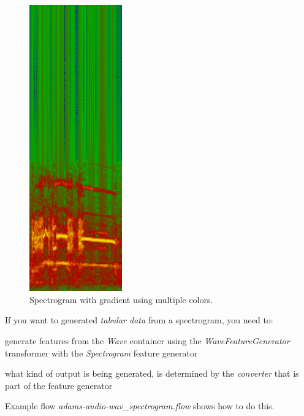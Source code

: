 \documentclass[a4paper]{book}
\begin{document}
\begin{figure}[htb]
  \centering
  \includegraphics[width=4.0cm]{images/spectrogram.png}
  \caption{Spectrogram with gradient using multiple colors.}
  \label{spectrogram}
\end{figure}

\clearpage
\noindent If you want to generated \textit{tabular data} from a spectrogram,
you need to:
\begin{tight_itemize}
  \item generate features from the \textit{Wave} container using the
  \textit{WaveFeatureGenerator} transformer with the \textit{Spectrogram}
  feature generator
  \item what kind of output is being generated, is determined by the
  \textit{converter} that is part of the feature generator
\end{tight_itemize}
Example flow \textit{adams-audio-wav\_spectrogram.flow} shows how to do this.



\end{document}
